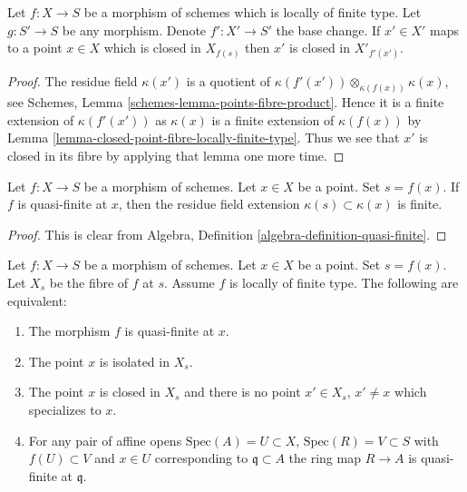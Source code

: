 \begin{lemma}
\label{lemma-base-change-closed-point-fibre-locally-finite-type}
Let $f : X \to S$ be a morphism of schemes which is locally of finite type.
Let $g : S' \to S$ be any morphism. Denote $f' : X' \to S'$ the base change.
If $x' \in X'$ maps to a point $x \in X$ which is closed in $X_{f(s)}$
then $x'$ is closed in $X'_{f'(x')}$.
\end{lemma}

\begin{proof}
The residue field $\kappa(x')$ is a quotient of
$\kappa(f'(x')) \otimes_{\kappa(f(x))} \kappa(x)$, see
Schemes, Lemma \ref{schemes-lemma-points-fibre-product}.
Hence it is a finite extension of $\kappa(f'(x'))$ as
$\kappa(x)$ is a finite extension of $\kappa(f(x))$ by
Lemma \ref{lemma-closed-point-fibre-locally-finite-type}.
Thus we see that $x'$ is closed in its fibre by applying that lemma
one more time.
\end{proof}

\begin{lemma}
\label{lemma-residue-field-quasi-finite}
Let $f : X \to S$ be a morphism of schemes.
Let $x \in X$ be a point. Set $s = f(x)$.
If $f$ is quasi-finite at $x$, then the residue field
extension $\kappa(s) \subset \kappa(x)$ is finite.
\end{lemma}

\begin{proof}
This is clear from Algebra, Definition \ref{algebra-definition-quasi-finite}.
\end{proof}

\begin{lemma}
\label{lemma-quasi-finite-at-point-characterize}
Let $f : X \to S$ be a morphism of schemes.
Let $x \in X$ be a point. Set $s = f(x)$.
Let $X_s$ be the fibre of $f$ at $s$.
Assume $f$ is locally of finite type.
The following are equivalent:
\begin{enumerate}
\item The morphism $f$ is quasi-finite at $x$.
\item The point $x$ is isolated in $X_s$.
\item The point $x$ is closed in $X_s$
and there is no point $x' \in X_s$, $x' \not = x$
which specializes to $x$.
\item For any pair of affine opens
$\text{Spec}(A) = U \subset X$, $\text{Spec}(R) = V \subset S$ with
$f(U) \subset V$ and $x \in U$ corresponding to $\mathfrak q \subset A$
the ring map $R \to A$ is quasi-finite at $\mathfrak q$.
\end{enumerate}
\end{lemma}

